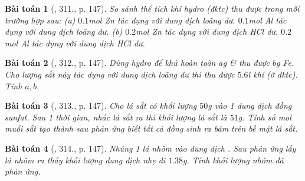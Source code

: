 \documentclass{article}
\newtheorem{baitoan}{Bài toán}
\begin{document}
\begin{baitoan}[\cite{An_400_BT_Hoa_Hoc_8_2020}, 311., p. 147]
	So sánh thể tích khí hydro (đktc) thu được trong mỗi trường hợp sau: (a) $0.1$\emph{mol Zn} tác dụng với dung dịch \emph{} loãng dư. $0.1$\emph{mol Al} tác dụng với dung dịch \emph{} loãng dư. (b) $0.2$\emph{mol Zn} tác dụng với dung dịch \emph{HCl} dư. $0.2$\emph{mol Al} tác dụng với dung dịch \emph{HCl} dư.
\end{baitoan}

\begin{baitoan}[\cite{An_400_BT_Hoa_Hoc_8_2020}, 312., p. 147]
	Dùng hydro để khử hoàn toàn $a$\emph{g} \emph{} \& thu được $b$\emph{g Fe}. Cho lượng sắt này tác dụng với dung dịch \emph{} loãng dư thì thu được $5.6$\emph{l} khí \emph{} (ở đktc). Tính $a,b$.
\end{baitoan}

\begin{baitoan}[\cite{An_400_BT_Hoa_Hoc_8_2020}, 313., p. 147]
	Cho lá sắt có khối lượng $50$\emph{g} vào 1 dung dịch đồng sunfat. Sau 1 thời gian, nhấc lá sắt ra thì khối lượng lá sắt là $51$\emph{g}. Tính số \emph{mol} muối sắt tạo thành sau phản ứng biết tất cả đồng sinh ra bám trên bề mặt lá sắt.
\end{baitoan}

\begin{baitoan}[\cite{An_400_BT_Hoa_Hoc_8_2020}, 314., p. 147]
	Nhúng 1 lá nhôm vào dung dịch \emph{}. Sau phản ứng lấy lá nhôm ra thấy khối lượng dung dịch nhẹ đi $1.38$\emph{g}. Tính khối lượng nhôm đã phản ứng.
\end{baitoan}

\end{document}
